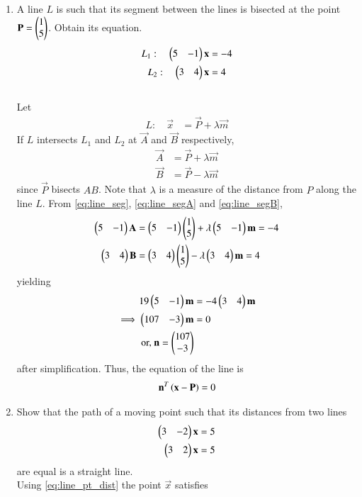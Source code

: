 \begin{enumerate}[label=\arabic*.,ref=\thesubsection.\theenumi]
\item A line $L$ is such that its segment between the lines %
is bisected at the point $\mathbf{P} = \begin{pmatrix}1\\5\end{pmatrix}$.  Obtain its equation.
\begin{align}
\label{eq:line_seg}
L_1: \quad \begin{pmatrix}5 & -1\end{pmatrix}\mathbf{x}  &= -4
\\
L_2: \quad \begin{pmatrix}3 & 4\end{pmatrix}\mathbf{x}  &= 4
\end{align}
%
\\
\solution Let 
%
\begin{align}
L: \quad \vec{x}  &= \vec{P} + \lambda \vec{m}
\end{align}
%
If $L$ intersects $L_1$ and $L_2$ at $\vec{A}$ and $\vec{B}$ respectively, 
%
\begin{align}
\label{eq:line_segA}
 \vec{A}  &= \vec{P} + \lambda \vec{m}
\\
 \vec{B}  &= \vec{P} - \lambda \vec{m}
\label{eq:line_segB}
\end{align}
%
since $\vec{P}$ bisects $AB$. Note that $\lambda$ is a measure of the distance from $P$  along the line $L$.
%
From \eqref{eq:line_seg}, \eqref{eq:line_segA} and \eqref{eq:line_segB},
%
\begin{align}
\begin{pmatrix}5 & -1\end{pmatrix} \mathbf{A}  &= \begin{pmatrix}5 & -1\end{pmatrix}\begin{pmatrix}1\\5\end{pmatrix} + \lambda \begin{pmatrix}5 & -1\end{pmatrix}\mathbf{m}=-4
\\
\begin{pmatrix}3 & 4\end{pmatrix} \mathbf{B}  &= \begin{pmatrix}3 & 4\end{pmatrix}\begin{pmatrix}1\\5\end{pmatrix} - \lambda \begin{pmatrix}3 & 4\end{pmatrix}\mathbf{m}=4
\end{align}
%
yielding
%
\begin{align}
19\begin{pmatrix}5 & -1\end{pmatrix}\mathbf{m}&=-4 \begin{pmatrix}3 & 4\end{pmatrix}\mathbf{m}
\\
\implies \begin{pmatrix}107 & -3\end{pmatrix}\mathbf{m} &= 0
\\
\text{or, } \mathbf{n} = \begin{pmatrix}107\\-3\end{pmatrix}
\end{align}
%
after simplification.
Thus, the equation of the line is 
\begin{align}
\mathbf{n}^T\left(\mathbf{x}-\mathbf{P}\right) =0
\end{align}
\item Show that the path of a moving point such that its distances from two lines
%
\begin{align}
\begin{pmatrix}3 & -2\end{pmatrix}\mathbf{x}  &= 5
\\
\begin{pmatrix}3 & 2\end{pmatrix}\mathbf{x}  &= 5
\end{align}
%
are  equal is a straight line.
%
\\
\solution Using \eqref{eq:line_pt_dist} the point $\vec{x}$ satisfies

\end{enumerate}
